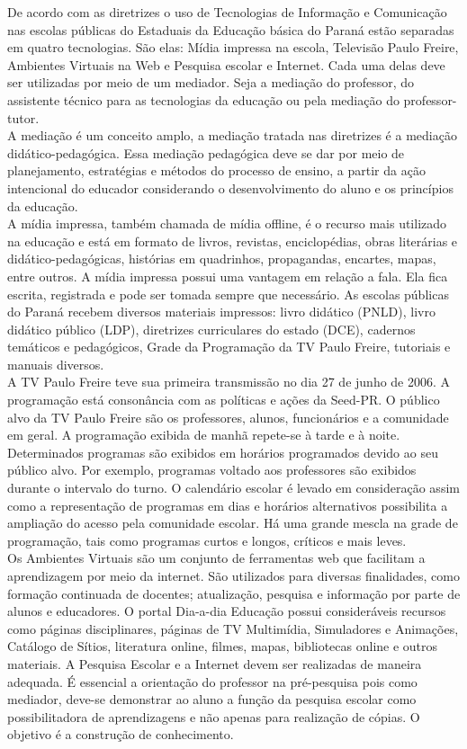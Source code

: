 \documentclass[a4paper, 12pt]{article}
\begin{document}
\begin{enumerate}
\begin{enumerate}
      De acordo com as diretrizes o uso de Tecnologias de Informação e Comunicação nas escolas públicas do Estaduais da Educação básica do Paraná estão separadas em quatro tecnologias. São elas: Mídia impressa na escola, Televisão Paulo Freire, Ambientes Virtuais na Web e Pesquisa escolar e Internet. Cada uma delas deve ser utilizadas por meio de um mediador. Seja a mediação do professor, do assistente técnico para as tecnologias da educação ou pela mediação do professor-tutor. \\
      A mediação é um conceito amplo, a mediação tratada nas diretrizes é a mediação didático-pedagógica. Essa mediação pedagógica deve se dar por meio de planejamento, estratégias e métodos do processo de ensino, a  partir da ação intencional do educador considerando o desenvolvimento do aluno e os princípios da educação. \\
      A mídia impressa, também chamada de mídia offline, é o recurso mais utilizado na educação e está em formato de livros, revistas, enciclopédias, obras literárias e didático-pedagógicas, histórias em quadrinhos, propagandas, encartes, mapas, entre outros. A mídia impressa possui uma vantagem em relação a fala. Ela fica escrita, registrada e pode ser tomada sempre que necessário. As escolas públicas do Paraná recebem diversos materiais impressos: livro didático (PNLD), livro didático público (LDP), diretrizes curriculares do estado (DCE), cadernos temáticos e pedagógicos, Grade da Programação da TV Paulo Freire, tutoriais e manuais diversos. \\
      A TV Paulo Freire teve sua primeira transmissão no dia 27 de junho de 2006. A programação está consonância com as políticas e ações da Seed-PR. O público alvo da TV Paulo Freire são os professores, alunos, funcionários e a comunidade em geral. A programação exibida de manhã repete-se à tarde e à noite. Determinados programas são exibidos em horários programados devido ao seu público alvo. Por exemplo, programas voltado aos professores são exibidos durante o intervalo do turno. O calendário escolar é levado em consideração assim como a representação de programas em dias e horários alternativos possibilita a ampliação do acesso pela comunidade escolar. Há uma grande mescla na grade de programação, tais como programas curtos e longos, críticos e mais leves. \\
      Os Ambientes Virtuais são um conjunto de ferramentas web que facilitam a aprendizagem por meio da internet. São utilizados para diversas finalidades, como formação continuada de docentes; atualização, pesquisa e informação por parte de alunos e educadores. O portal Dia-a-dia Educação possui consideráveis recursos como páginas disciplinares, páginas de TV Multimídia, Simuladores e Animações, Catálogo de Sítios, literatura online, filmes, mapas, bibliotecas online e outros materiais.
      A Pesquisa Escolar e a Internet devem ser realizadas de maneira adequada. É essencial a orientação do professor na pré-pesquisa pois como mediador, deve-se demonstrar ao aluno a função da pesquisa escolar como possibilitadora de aprendizagens e não apenas para realização de cópias. O objetivo é a construção de conhecimento.
      

\end{enumerate}
\end{enumerate}
\end{document}
